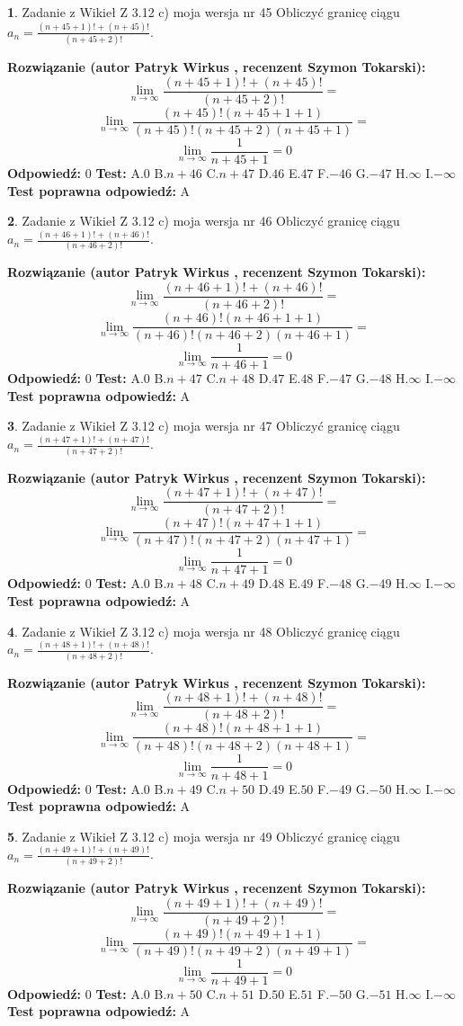 \documentclass[12pt, a4paper]{article}
\theoremstyle{definition} %
\newtheorem{zad}{}
\newcommand{\zadStart}[1]{\begin{zad}#1\newline}
\newcommand{\zadStop}{\end{zad}}
\newcommand{\rozwStart}[2]{\noindent \textbf{Rozwiązanie (autor #1 , recenzent #2): }\newline}
\newcommand{\rozwStop}{\newline}
\newcommand{\odpStart}{\noindent \textbf{Odpowiedź:}\newline}
\newcommand{\odpStop}{\newline}
\newcommand{\testStart}{\noindent \textbf{Test:}\newline}
\newcommand{\testStop}{\newline}
\newcommand{\kluczStart}{\noindent \textbf{Test poprawna odpowiedź:}\newline}
\newcommand{\kluczStop}{\newline}
\begin{document}
\zadStart{Zadanie z Wikieł Z 3.12 c) moja wersja nr 45}
Obliczyć granicę ciągu $a_{n}=\frac{(n+45+1)!+(n+45)!}{(n+45+2)!}$.
\zadStop
\rozwStart{Patryk Wirkus}{Szymon Tokarski}
$$\lim\limits_{n\to\infty}\frac{(n+45+1)!+(n+45)!}{(n+45+2)!}=$$
$$\lim\limits_{n\to\infty}\frac{(n+45)!(n+45+1+1)}{(n+45)!(n+45+2)(n+45+1)}=$$
$$\lim\limits_{n\to\infty}\frac{1}{n+45+1}= 0$$
\rozwStop
\odpStart
$0$
\odpStop
\testStart
A.$0$
B.$n+46$
C.$n+47$
D.$46$
E.$47$
F.$-46$
G.$-47$
H.$\infty$
I.$-\infty$
\testStop
\kluczStart
A
\kluczStop



\zadStart{Zadanie z Wikieł Z 3.12 c) moja wersja nr 46}
Obliczyć granicę ciągu $a_{n}=\frac{(n+46+1)!+(n+46)!}{(n+46+2)!}$.
\zadStop
\rozwStart{Patryk Wirkus}{Szymon Tokarski}
$$\lim\limits_{n\to\infty}\frac{(n+46+1)!+(n+46)!}{(n+46+2)!}=$$
$$\lim\limits_{n\to\infty}\frac{(n+46)!(n+46+1+1)}{(n+46)!(n+46+2)(n+46+1)}=$$
$$\lim\limits_{n\to\infty}\frac{1}{n+46+1}= 0$$
\rozwStop
\odpStart
$0$
\odpStop
\testStart
A.$0$
B.$n+47$
C.$n+48$
D.$47$
E.$48$
F.$-47$
G.$-48$
H.$\infty$
I.$-\infty$
\testStop
\kluczStart
A
\kluczStop



\zadStart{Zadanie z Wikieł Z 3.12 c) moja wersja nr 47}
Obliczyć granicę ciągu $a_{n}=\frac{(n+47+1)!+(n+47)!}{(n+47+2)!}$.
\zadStop
\rozwStart{Patryk Wirkus}{Szymon Tokarski}
$$\lim\limits_{n\to\infty}\frac{(n+47+1)!+(n+47)!}{(n+47+2)!}=$$
$$\lim\limits_{n\to\infty}\frac{(n+47)!(n+47+1+1)}{(n+47)!(n+47+2)(n+47+1)}=$$
$$\lim\limits_{n\to\infty}\frac{1}{n+47+1}= 0$$
\rozwStop
\odpStart
$0$
\odpStop
\testStart
A.$0$
B.$n+48$
C.$n+49$
D.$48$
E.$49$
F.$-48$
G.$-49$
H.$\infty$
I.$-\infty$
\testStop
\kluczStart
A
\kluczStop



\zadStart{Zadanie z Wikieł Z 3.12 c) moja wersja nr 48}
Obliczyć granicę ciągu $a_{n}=\frac{(n+48+1)!+(n+48)!}{(n+48+2)!}$.
\zadStop
\rozwStart{Patryk Wirkus}{Szymon Tokarski}
$$\lim\limits_{n\to\infty}\frac{(n+48+1)!+(n+48)!}{(n+48+2)!}=$$
$$\lim\limits_{n\to\infty}\frac{(n+48)!(n+48+1+1)}{(n+48)!(n+48+2)(n+48+1)}=$$
$$\lim\limits_{n\to\infty}\frac{1}{n+48+1}= 0$$
\rozwStop
\odpStart
$0$
\odpStop
\testStart
A.$0$
B.$n+49$
C.$n+50$
D.$49$
E.$50$
F.$-49$
G.$-50$
H.$\infty$
I.$-\infty$
\testStop
\kluczStart
A
\kluczStop



\zadStart{Zadanie z Wikieł Z 3.12 c) moja wersja nr 49}
Obliczyć granicę ciągu $a_{n}=\frac{(n+49+1)!+(n+49)!}{(n+49+2)!}$.
\zadStop
\rozwStart{Patryk Wirkus}{Szymon Tokarski}
$$\lim\limits_{n\to\infty}\frac{(n+49+1)!+(n+49)!}{(n+49+2)!}=$$
$$\lim\limits_{n\to\infty}\frac{(n+49)!(n+49+1+1)}{(n+49)!(n+49+2)(n+49+1)}=$$
$$\lim\limits_{n\to\infty}\frac{1}{n+49+1}= 0$$
\rozwStop
\odpStart
$0$
\odpStop
\testStart
A.$0$
B.$n+50$
C.$n+51$
D.$50$
E.$51$
F.$-50$
G.$-51$
H.$\infty$
I.$-\infty$
\testStop
\kluczStart
A
\kluczStop
\end{document}
